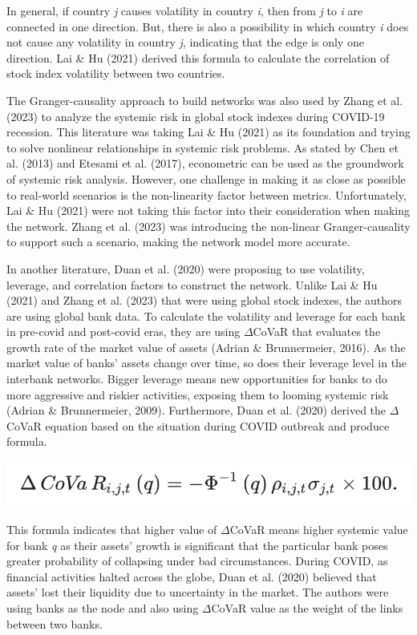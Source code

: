 \documentclass[a4paper,11pt]{article}
\begin{document}
In general, if country \textit{j} causes volatility in country \textit{i}, then from \textit{j} to \textit{i} are connected in one direction. But, there is also a possibility in which country \textit{i} does not cause any volatility in country \textit{j}, indicating that the edge is only one direction. Lai \& Hu (2021) derived this formula to calculate the correlation of stock index volatility between two countries.

The Granger-causality approach to build networks was also used by Zhang et al. (2023) to analyze the systemic risk in global stock indexes during COVID-19 recession. This literature was taking Lai \& Hu (2021) as its foundation and trying to solve nonlinear relationships in systemic risk problems. As stated by Chen et al. (2013) and Etesami et al. (2017), econometric can be used as the groundwork of systemic risk analysis. However, one challenge in making it as close as possible to real-world scenarios is the non-linearity factor between metrics. Unfortunately, Lai \& Hu (2021) were not taking this factor into their consideration when making the network. Zhang et al. (2023) was introducing the non-linear Granger-causality to support such a scenario, making the network model more accurate. 

In another literature, Duan et al. (2020) were proposing to use volatility, leverage, and correlation factors to construct the network. Unlike Lai \& Hu (2021) and Zhang et al. (2023) that were using global stock indexes, the authors are using global bank data. To calculate the volatility and leverage for each bank in pre-covid and post-covid eras, they are using $\Delta$CoVaR that evaluates the growth rate of the market value of assets (Adrian \& Brunnermeier, 2016). As the market value of banks’ assets change over time, so does their leverage level in the interbank networks. Bigger leverage means new opportunities for banks to do more aggressive and riskier activities, exposing them to looming systemic risk (Adrian \& Brunnermeier, 2009). Furthermore, Duan et al. (2020) derived the $\Delta$CoVaR equation based on the situation during COVID outbreak and produce formula.

\includegraphics[scale=0.7]{covar.png}

This formula indicates that higher value of $\Delta$CoVaR means higher systemic value for bank \textit{q} as their assets’ growth is significant that the particular bank poses greater probability of collapsing under bad circumstances. During COVID, as financial activities halted across the globe, Duan et al. (2020) believed that assets’ lost their liquidity due to uncertainty in the market. The authors were using banks as the node and also using $\Delta$CoVaR value as the weight of the links between two banks.
\end{document}
